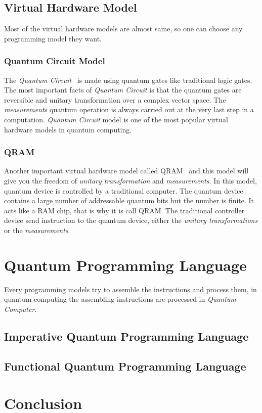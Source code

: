 \documentclass[11pt, conference, onecolumn]{IEEEtran}
\begin{document}
\subsection{Virtual Hardware Model}
Most of the virtual hardware models are almost same, so one can choose any programming model they want.

\subsubsection{Quantum Circuit Model}
The \textit{Quantum Circuit}~\cite{yao1993quantum} is made using quantum gates like traditional logic gates. The most important facts of \textit{Quantum Circuit} is that the quantum gates 
are reversible and unitary transformation over a complex vector space. The \textit{measurements} quantum operation is always carried out at the very last step in a computation. 
\textit{Quantum Circuit} model is one of the most popular virtual hardware models in quantum computing.

\subsubsection{QRAM}
Another important virtual hardware model called QRAM~\cite{knill1996conventions} and this model will give you the freedom of  \textit{unitary transformation} and \textit{measurements}. 
In this model, quantum device is controlled by a traditional computer. The quantum device contains a large number of addressable quantum bits but the number is finite. It acts like a 
RAM chip, that is why it is call QRAM. The traditional controller device send instruction to the quantum device, either the \textit{unitary transformations} or the \textit{measurements}.

\section{Quantum Programming Language}
Every programming models try to assemble the instructions and process them, in quantum computing the assembling instructions are processed in \textit{Quantum Computer}.

\subsection{Imperative Quantum Programming Language}

\subsection{Functional Quantum Programming Language}

\section{Conclusion}



\end{document}
